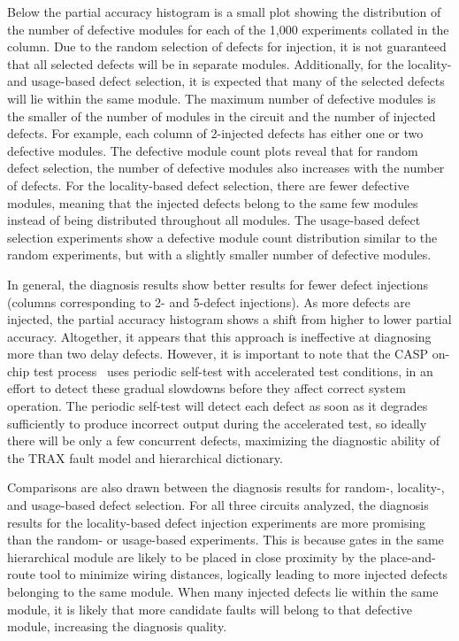 Below the partial accuracy histogram is a small plot showing the distribution of the number of defective modules for each of the 1,000 experiments collated in the column.
%
Due to the random selection of defects for injection, it is not guaranteed that all selected defects will be in separate modules.
%
Additionally, for the locality- and usage-based defect selection, it is expected that many of the selected defects will lie within the same module.
%
The maximum number of defective modules is the smaller of the number of modules in the circuit and the number of injected defects.
%
For example, each column of 2-injected defects has either one or two defective modules.
%
The defective module count plots reveal that for random defect selection, the number of defective modules also increases with the number of defects.
%
For the locality-based defect selection, there are fewer defective modules, meaning that the injected defects belong to the same few modules instead of being distributed throughout all modules.
%
The usage-based defect selection experiments show a defective module count distribution similar to the random experiments, but with a slightly smaller number of defective modules.

In general, the diagnosis results show better results for fewer defect injections (columns corresponding to 2- and 5-defect injections).
%
As more defects are injected, the partial accuracy histogram shows a shift from higher to lower partial accuracy.
%
Altogether, it appears that this approach is ineffective at diagnosing more than two delay defects.
%
However, it is important to note that the CASP on-chip test process~\cite{li08} uses periodic self-test with accelerated test conditions, in an effort to detect these gradual slowdowns before they affect correct system operation.
%
The periodic self-test will detect each defect as soon as it degrades sufficiently to produce incorrect output during the accelerated test, so ideally there will be only a few concurrent defects, maximizing the diagnostic ability of the TRAX fault model and hierarchical dictionary.

Comparisons are also drawn between the diagnosis results for random-, locality-, and usage-based defect selection.
%
For all three circuits analyzed, the diagnosis results for the locality-based defect injection experiments are more promising than the random- or usage-based experiments.
%
This is because gates in the same hierarchical module are likely to be placed in close proximity by the place-and-route tool to minimize wiring distances, logically leading to more injected defects belonging to the same module.
%
When many injected defects lie within the same module, it is likely that more candidate faults will belong to that defective module, increasing the diagnosis quality.

